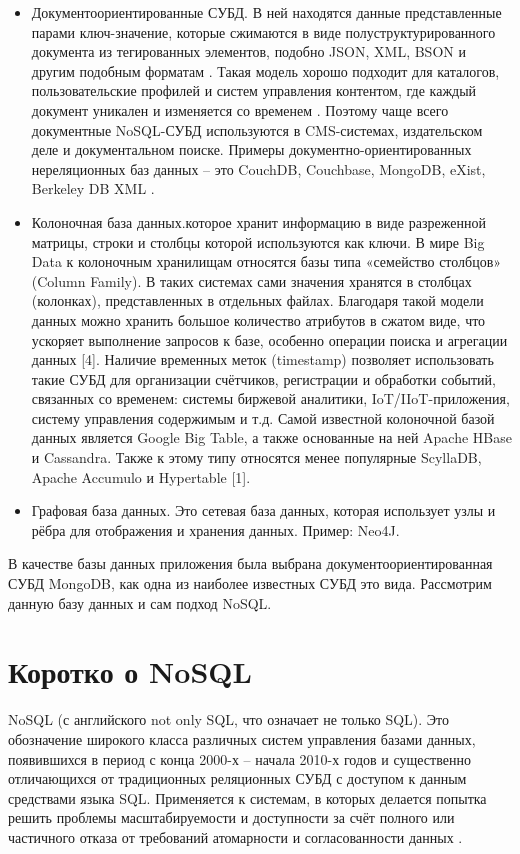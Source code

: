 \documentclass[14pt]{extreport}
\begin{document}
\begin{itemize}
\item Документоориентированные СУБД. В ней находятся данные представленные парами ключ-значение, которые сжимаются в виде полуструктурированного документа из тегированных элементов, подобно JSON, XML, BSON и другим подобным форматам \cite{nosqlAws}. Такая модель хорошо подходит для каталогов, пользовательские профилей и систем управления контентом, где каждый документ уникален и изменяется со временем \cite{nosqlTp}.  Поэтому чаще всего документные NoSQL-СУБД используются в CMS-системах, издательском деле и документальном поиске. Примеры документно-ориентированных нереляционных баз данных -- это CouchDB, Couchbase, MongoDB, eXist, Berkeley DB XML  \cite{nosqlWiki}.
\item Колоночная база данных.которое хранит информацию в виде разреженной матрицы, строки и столбцы которой используются как ключи. В мире Big Data к колоночным хранилищам относятся базы типа «семейство столбцов» (Column Family). В таких системах сами значения хранятся в столбцах (колонках), представленных в отдельных файлах. Благодаря такой модели данных можно хранить большое количество атрибутов в сжатом виде, что ускоряет выполнение запросов к базе, особенно операции поиска и агрегации данных [4]. Наличие временных меток (timestamp) позволяет использовать такие СУБД для организации счётчиков, регистрации и обработки событий, связанных со временем: системы биржевой аналитики, IoT/IIoT-приложения, систему управления содержимым и т.д. Самой известной колоночной базой данных является Google Big Table, а также основанные на ней Apache HBase и Cassandra. Также к этому типу относятся менее популярные ScyllaDB, Apache Accumulo и Hypertable [1].
\item Графовая база данных. Это сетевая база данных, которая использует
узлы и рёбра для отображения и хранения данных. Пример: Neo4J.
\end{itemize}

В качестве базы данных приложения была выбрана документоориентированная СУБД MongoDB, как одна из наиболее известных СУБД это вида. Рассмотрим данную базу данных и сам подход NoSQL.


\section{Коротко о NoSQL}
NoSQL (с английского not only SQL, что означает не только SQL). Это обозначение широкого класса различных систем управления базами данных, появившихся в период с конца 2000-х -- начала 2010-х годов и существенно отличающихся от традиционных реляционных СУБД с доступом к данным средствами языка SQL. Применяется к системам, в которых делается попытка решить проблемы масштабируемости и доступности за счёт полного или частичного отказа от требований атомарности и согласованности данных \cite{nosqlFauler}. 
\end{document}
